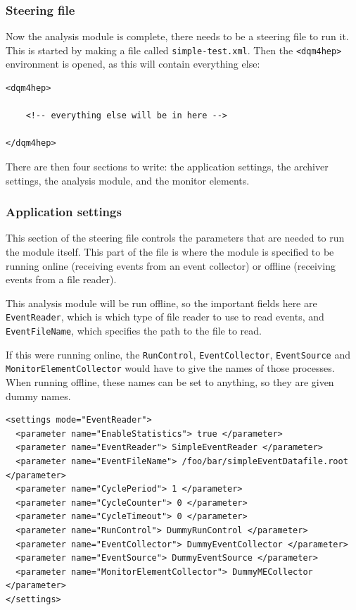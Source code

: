 \subsubsection{Steering file}
Now the analysis module is complete, there needs to be a steering file to run it. This is started by making a file called \texttt{simple-test.xml}. Then the \texttt{<dqm4hep>} environment is opened, as this will contain everything else:

\begin{lstlisting}
<dqm4hep>

    <!-- everything else will be in here -->

</dqm4hep>
\end{lstlisting}

There are then four sections to write: the application settings, the archiver settings, the analysis module, and the monitor elements.

\subsubsection{Application settings}
This section of the steering file controls the parameters that are needed to run the module itself. This part of the file is where the module is specified to be running online (receiving events from an event collector) or offline (receiving events from a file reader).

This analysis module will be run offline, so the important fields here are \texttt{EventReader}, which is which type of file reader to use to read events, and \texttt{EventFileName}, which specifies the path to the file to read.

If this were running online, the \texttt{RunControl}, \texttt{EventCollector}, \texttt{EventSource} and \texttt{MonitorElementCollector} would have to give the names of those processes. When running offline, these names can be set to anything, so they are given dummy names.

\begin{lstlisting}
<settings mode="EventReader">
  <parameter name="EnableStatistics"> true </parameter>
  <parameter name="EventReader"> SimpleEventReader </parameter>
  <parameter name="EventFileName"> /foo/bar/simpleEventDatafile.root </parameter>
  <parameter name="CyclePeriod"> 1 </parameter>
  <parameter name="CycleCounter"> 0 </parameter>
  <parameter name="CycleTimeout"> 0 </parameter>
  <parameter name="RunControl"> DummyRunControl </parameter>
  <parameter name="EventCollector"> DummyEventCollector </parameter>
  <parameter name="EventSource"> DummyEventSource </parameter>
  <parameter name="MonitorElementCollector"> DummyMECollector </parameter>
</settings>
\end{lstlisting}

